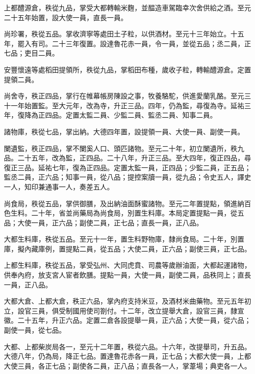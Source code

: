 \begin{pinyinscope}
 上都醴源倉，秩從九品，掌受大都轉輸米麴，並醖造車駕臨幸次舍供給之酒。至元二十五年始置，設大使一員，直長一員。



 尚珍署，秩從五品。掌收濟寧等處田土子粒，以供酒材。至元十三年始立。十五年，罷入有司。二十三年復置。設達魯花赤一員，令一員，並從五品；丞二員，正七品；吏目二員。



 安豐懷遠等處稻田提領所，秩從九品，掌稻田布種，歲收子粒，轉輸醴源倉。定置提領二員。



 尚舍寺，秩正四品，掌行在帷幕帳房陳設之事，牧養駱駝，供進愛蘭乳酪。至元三十一年始置監。至大元年，改為寺，升正三品。四年，仍為監，尋復為寺。延祐三年，復降為正四品。定置太監二員、少監二員、監丞二員、知事二員。



 諸物庫，秩從七品，掌出納。大德四年置，設提領一員、大使一員、副使一員。



 闌遺監，秩正四品，掌不闌奚人口、頭匹諸物。至元二十年，初立闌遺所，秩九品。二十五年，改為監，正四品。二十八年，升正三品。至大四年，復正四品，尋復正三品。延祐七年，復為正四品。定置太監一員，正四品；少監二員，正五品；監丞二員，正六品；知事一員，從八品；提控案牘一員，從九品；令史五人，譯史一人，知印兼通事一人，奏差五人。



 尚食局，秩從五品，掌供御膳，及出納油面酥蜜諸物。至元二年置提點，領進納百色生料。二十年，省並尚藥局為尚食局，別置生料庫。本局定置提點一員，從五品；大使一員，正六品；副使二員，正七品；直長一員，正八品。



 大都生料庫，秩從五品。至元十一年，置生料野物庫，隸尚食局。二十年，別置庫，擬內藏庫例，置提點二員，從五品；大使二員，正六品；副使三員，正七品。



 上都生料庫，秩從五品，掌受弘州、大同虎賁、司農等歲辦油面，大都起運諸物，供奉內府，放支宮人宦者飲膳。提點一員，大使一員，副使二員，品秩同上；直長一員，正八品。



 大都大倉、上都大倉，秩正六品，掌內府支持米豆，及酒材米曲藥物。至元五年初立，設官三員，俱受制國用使司劄付。十二年，改立提舉大倉，設官三員，隸宣徽。二十五年，升正六品。定置二倉各設提舉一員，正六品；大使一員，從六品；副使一員，從七品。



 大都、上都柴炭局各一，至元十二年置，秩從六品。十六年，改提舉司，升五品。大德八年，仍為局，降正七品。置達魯花赤各一員，正七品；大都大使一員，上都大使三員，各正七品；副使各二員，正八品；直長各一人，掌葦場；典吏各一人。




\end{pinyinscope}
